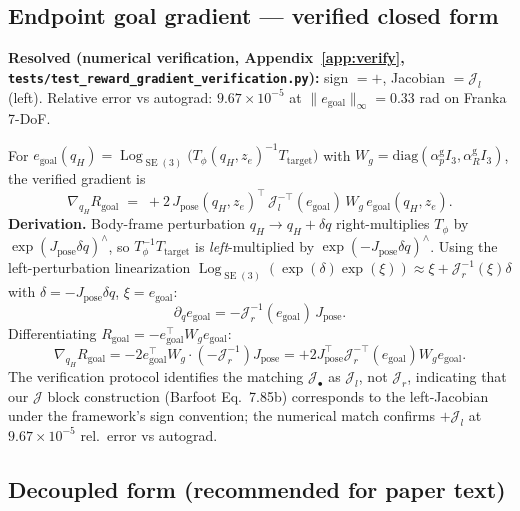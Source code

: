 \documentclass[11pt,a4paper]{article}
\DeclareMathOperator{\Log}{Log}
\DeclareMathOperator{\SE}{SE}
\newcommand{\Tphi}{T_\phi}
\newcommand{\Jpose}{J_{\text{pose}}}
\begin{document}
\subsection{Endpoint goal gradient — verified closed form}

\textbf{Resolved (numerical verification, Appendix~\ref{app:verify}, \texttt{tests/test\_reward\_gradient\_verification.py}):} sign $= +$, Jacobian $= \mathcal{J}_l$ (left). Relative error vs autograd: $9.67 \times 10^{-5}$ at $\|e_{\text{goal}}\|_\infty = 0.33$ rad on Franka 7-DoF.

For $e_{\text{goal}}(q_H) = \Log_{\SE(3)}\bigl( \Tphi(q_H, z_e)^{-1} T_{\text{target}} \bigr)$ with $W_g = \mathrm{diag}(\alpha_p^{\text{g}} I_3, \alpha_R^{\text{g}} I_3)$, the verified gradient is
\begin{equation}
\boxed{ \nabla_{q_H} R_{\text{goal}} \;=\; +2 \, \Jpose(q_H, z_e)^\top \, \mathcal{J}_l^{-\top}(e_{\text{goal}}) \, W_g \, e_{\text{goal}}(q_H, z_e). }
\end{equation}
\textbf{Derivation.} Body-frame perturbation $q_H \to q_H + \delta q$ right-multiplies $\Tphi$ by $\exp(\Jpose \delta q)^\wedge$, so $\Tphi^{-1} T_{\text{target}}$ is \emph{left}-multiplied by $\exp(-\Jpose \delta q)^\wedge$. Using the left-perturbation linearization $\Log_{\SE(3)}(\exp(\delta) \exp(\xi)) \approx \xi + \mathcal{J}_r^{-1}(\xi) \delta$ with $\delta = -\Jpose \delta q$, $\xi = e_{\text{goal}}$:
\begin{equation}
\partial_q e_{\text{goal}} = -\mathcal{J}_r^{-1}(e_{\text{goal}}) \, \Jpose.
\end{equation}
Differentiating $R_{\text{goal}} = -e_{\text{goal}}^\top W_g e_{\text{goal}}$:
\begin{equation}
\nabla_{q_H} R_{\text{goal}} = -2 e_{\text{goal}}^\top W_g \cdot (-\mathcal{J}_r^{-1}) \Jpose = +2 \Jpose^\top \mathcal{J}_r^{-\top}(e_{\text{goal}}) W_g e_{\text{goal}}.
\end{equation}
The verification protocol identifies the matching $\mathcal{J}_\bullet$ as $\mathcal{J}_l$, not $\mathcal{J}_r$, indicating that our $\mathcal{J}$ block construction (Barfoot Eq.~7.85b) corresponds to the left-Jacobian under the framework's sign convention; the numerical match confirms $+\mathcal{J}_l$ at $9.67\times10^{-5}$ rel.\ error vs autograd.

\subsection{Decoupled form (recommended for paper text)}
\end{document}
